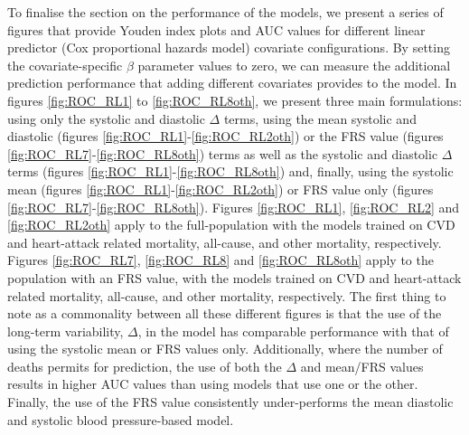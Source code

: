 \documentclass[
]{article}
\begin{document}
To finalise the section on the performance of the models, we present a series of figures that provide Youden index plots and AUC values for different linear predictor (Cox proportional hazards model) covariate configurations.
By setting the covariate-specific \(\beta\) parameter values to zero, we can measure the additional prediction performance that adding different covariates provides to the model. In figures \ref{fig:ROC_RL1} to \ref{fig:ROC_RL8oth}, we present three main formulations: using only the systolic and diastolic \(\Delta\) terms, using the mean systolic and diastolic (figures \ref{fig:ROC_RL1}-\ref{fig:ROC_RL2oth}) or the FRS value (figures \ref{fig:ROC_RL7}-\ref{fig:ROC_RL8oth}) terms as well as the systolic and diastolic \(\Delta\) terms (figures \ref{fig:ROC_RL1}-\ref{fig:ROC_RL8oth}) and, finally, using the systolic mean (figures \ref{fig:ROC_RL1}-\ref{fig:ROC_RL2oth}) or FRS value only (figures \ref{fig:ROC_RL7}-\ref{fig:ROC_RL8oth}). Figures \ref{fig:ROC_RL1}, \ref{fig:ROC_RL2} and \ref{fig:ROC_RL2oth} apply to the full-population with the models trained on CVD and heart-attack related mortality, all-cause, and other mortality, respectively. Figures \ref{fig:ROC_RL7}, \ref{fig:ROC_RL8} and \ref{fig:ROC_RL8oth} apply to the population with an FRS value, with the models trained on CVD and heart-attack related mortality, all-cause, and other mortality, respectively. The first thing to note as a commonality between all these different figures is that the use of the long-term variability, \(\Delta\), in the model has comparable performance with that of using the systolic mean or FRS values only. Additionally, where the number of deaths permits for prediction, the use of both the \(\Delta\) and mean/FRS values results in higher AUC values than using models that use one or the other. Finally, the use of the FRS value consistently under-performs the mean diastolic and systolic blood pressure-based model.
\end{document}

